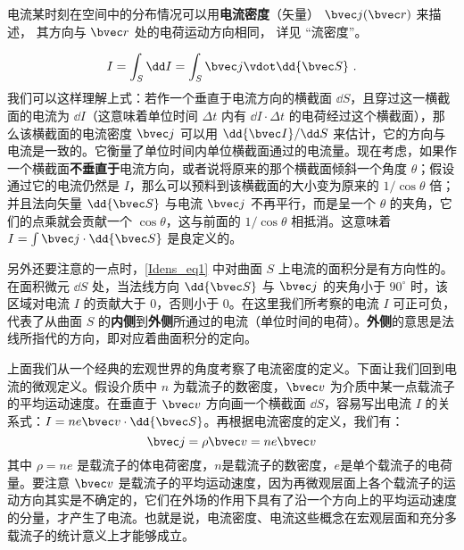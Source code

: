 

电流某时刻在空间中的分布情况可以用\textbf{电流密度}（矢量） $\bvec j(\bvec r)$ 来描述， 其方向与 $\bvec r$ 处的电荷运动方向相同， 详见 “流密度”。

\begin{equation}\label{Idens_eq1}
I = \int_S \dd I= \int_S \bvec j \vdot \dd{\bvec S}~.
\end{equation}
我们可以这样理解上式：若作一个垂直于电流方向的横截面 $\dd S$，且穿过这一横截面的电流为 $\dd I$（这意味着单位时间 $\Delta t$ 内有 $\dd I\cdot \Delta t$ 的电荷经过这个横截面），那么该横截面的电流密度 $\bvec j$ 可以用 $\dd{\bvec I}/\dd S$ 来估计，它的方向与电流是一致的。它衡量了单位时间内单位横截面通过的电流量。现在考虑，如果作一个横截面\textbf{不垂直于}电流方向，或者说将原来的那个横截面倾斜一个角度 $\theta$；假设通过它的电流仍然是 $I$，那么可以预料到该横截面的大小变为原来的 $1/\cos\theta$ 倍；并且法向矢量 $\dd{\bvec S}$ 与电流 $\bvec j$ 不再平行，而是呈一个 $\theta$ 的夹角，它们的点乘就会贡献一个 $\cos\theta$，这与前面的 $1/\cos\theta$ 相抵消。这意味着 $I=\int \bvec j\cdot \dd{\bvec S}$ 是良定义的。

另外还要注意的一点时，\autoref{Idens_eq1} 中对曲面 $S$ 上电流的面积分是有方向性的。在面积微元 $\dd S$ 处，当法线方向 $\dd{\bvec S}$ 与 $\bvec j$ 的夹角小于 $90^\circ$ 时，该区域对电流 $I$ 的贡献大于 $0$，否则小于 $0$。在这里我们所考察的电流 $I$ 可正可负，代表了从曲面 $S$ 的\textbf{内侧}到\textbf{外侧}所通过的电流（单位时间的电荷）。\textbf{外侧}的意思是法线所指代的方向，即对应着曲面积分的定向。

上面我们从一个经典的宏观世界的角度考察了电流密度的定义。下面让我们回到电流的微观定义。假设介质中 $n$ 为载流子的数密度，$\bvec v$ 为介质中某一点载流子的平均运动速度。在垂直于 $\bvec v$ 方向画一个横截面 $\dd S$，容易写出电流 $I$ 的关系式：$I=ne\bvec v \cdot \dd{\bvec S}$。再根据电流密度的定义，我们有：
\begin{equation}
\bvec j = \rho \bvec v = ne \bvec v
\end{equation}
其中 $\rho=ne$ 是载流子的体电荷密度，$n$是载流子的数密度，$e$是单个载流子的电荷量。要注意 $\bvec v$ 是载流子的平均运动速度，因为再微观层面上各个载流子的运动方向其实是不确定的，它们在外场的作用下具有了沿一个方向上的平均运动速度的分量，才产生了电流。也就是说，电流密度、电流这些概念在宏观层面和充分多载流子的统计意义上才能够成立\cite{GriffE}。
